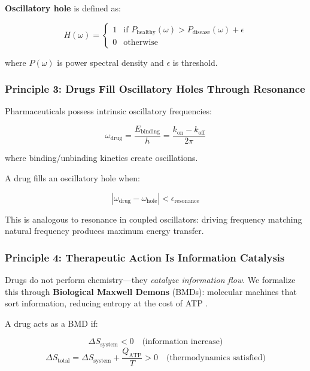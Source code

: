 \documentclass{article}
\begin{document}
\textbf{Oscillatory hole} is defined as:

\begin{equation}
H(\omega) = \begin{cases}
1 & \text{if } P_{\text{healthy}}(\omega) > P_{\text{disease}}(\omega) + \epsilon \\
0 & \text{otherwise}
\end{cases}
\end{equation}

where $P(\omega)$ is power spectral density and $\epsilon$ is threshold.

\subsubsection{Principle 3: Drugs Fill Oscillatory Holes Through Resonance}

Pharmaceuticals possess intrinsic oscillatory frequencies:

\begin{equation}
\omega_{\text{drug}} = \frac{E_{\text{binding}}}{h} = \frac{k_{\text{on}} - k_{\text{off}}}{2\pi}
\end{equation}

where binding/unbinding kinetics create oscillations.

A drug fills an oscillatory hole when:

\begin{equation}
|\omega_{\text{drug}} - \omega_{\text{hole}}| < \epsilon_{\text{resonance}}
\end{equation}

This is analogous to resonance in coupled oscillators: driving frequency matching natural frequency produces maximum energy transfer.

\subsubsection{Principle 4: Therapeutic Action Is Information Catalysis}

Drugs do not perform chemistry—they \textit{catalyze information flow}. We formalize this through \textbf{Biological Maxwell Demons} (BMDs): molecular machines that sort information, reducing entropy at the cost of ATP \citep{Sagawa2010}.

A drug acts as a BMD if:

\begin{equation}
\Delta S_{\text{system}} < 0 \quad \text{(information increase)}
\end{equation}
\begin{equation}
\Delta S_{\text{total}} = \Delta S_{\text{system}} + \frac{Q_{\text{ATP}}}{T} > 0 \quad \text{(thermodynamics satisfied)}
\end{equation}
\end{document}
